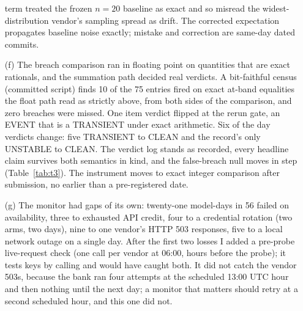 \documentclass[conference]{IEEEtran}
\begin{document}
\begin{enumerate}
  term treated the frozen $n{=}20$ baseline as exact and so misread
  the widest-distribution vendor's sampling spread as drift. The
  corrected expectation propagates baseline noise exactly; mistake
  and correction are same-day dated commits.
\item[(f)] The breach comparison ran in floating point on
  quantities that are exact rationals, and the summation path decided
  real verdicts. A bit-faithful census (committed script) finds 10 of
  the 75 entries fired on exact at-band equalities the float path read
  as strictly above, from both sides of the comparison, and zero
  breaches were missed. One item verdict flipped at the rerun gate, an
  EVENT that is a TRANSIENT under exact arithmetic. Six of the day
  verdicts change: five TRANSIENT to CLEAN and the record's only
  UNSTABLE to CLEAN. The verdict log stands as recorded, every
  headline claim survives both semantics in kind, and the false-breach
  null moves in step (Table~\ref{tab:t3}). The instrument moves to
  exact integer comparison after submission, no earlier than a
  pre-registered date. \item[(g)] The monitor had gaps of its own:
  twenty-one model-days in 56 failed on availability, three to
  exhausted API credit, four to a credential rotation (two arms, two
  days), nine to one vendor's HTTP 503 responses, five to a local
  network outage on a single day. After the first two losses I added a
  pre-probe live-request check (one call per vendor at 06:00, hours
  before the probe); it tests keys by calling and would have caught
  both. It did not catch the vendor 503s, because the bank ran four
  attempts at the scheduled 13:00 UTC hour and then nothing until the
  next day; a monitor that matters should retry at a second scheduled
  hour, and this one did not.
\end{enumerate}
\end{document}
